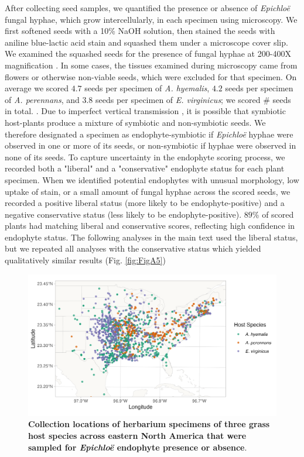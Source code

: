 \documentclass[11pt]{article}
\let\cite\citep
\begin{document}
After collecting seed samples, we quantified the presence or absence of \emph{Epichloë} fungal hyphae, which grow intercellularly, in each specimen using microscopy. 
We first softened seeds with a 10\% NaOH solution, then stained the seeds with aniline blue-lactic acid stain and squashed them under a microscope cover slip. 
We examined the squashed seeds for the presence of fungal hyphae at 200-400X magnification \cite{bacon2018stains}.
In some cases, the tissues examined during microscopy came from flowers or otherwise non-viable seeds, which were excluded for that specimen.
On average we scored $4.7$ seeds per specimen of \emph{A. hyemalis}, $4.2$ seeds per specimen of \emph{A. perennans}, and $3.8$ seeds per specimen of \emph{E. virginicus}; we scored \# seeds in total. .
Due to imperfect vertical transmission \cite{afkhami2008symbiosis}, it is possible that symbiotic host-plants produce a mixture of symbiotic and non-symbiotic seeds. 
We therefore designated a specimen as endophyte-symbiotic if \emph{Epichloë} hyphae were observed in one or more of its seeds, or non-symbiotic if hyphae were observed in none of its seeds. 
To capture uncertainty in the endophyte scoring process, we recorded both a "liberal" and a "conservative" endophyte status for each plant specimen.  
When we identified potential endophytes with unusual morphology, low uptake of stain, or a small amount of fungal hyphae across the scored seeds, we recorded a positive liberal status (more likely to be endophyte-positive) and a negative conservative status (less likely to be endophyte-positive). 
$89$\% of scored plants had matching liberal and conservative scores, reflecting high confidence in endophyte status.
The following analyses in the main text used the liberal status, but we repeated all analyses with the conservative status which yielded qualitatively similar results (Fig. \ref{fig:FigA5})

\begin{figure}[h]
	\centering
	\includegraphics[width = \linewidth]{../Plots/collections_map.png}
	\caption{\textbf{Collection locations of herbarium specimens of three grass host species across eastern North America that were sampled for \emph{Epichloë} endophyte presence or absence}.}
	\label{fig:map}
\end{figure}
\end{document}
